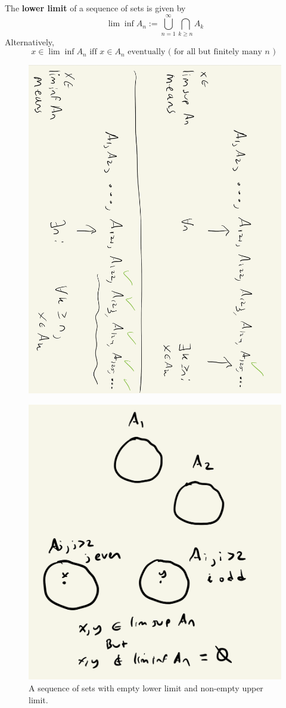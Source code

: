 \documentclass{article} %
\begin{document}
\begin{definition}
The \textbf{lower limit} of a sequence of sets is given by
\[ \lim\inf A_n := \bigcup_{n=1}^\infty \bigcap_{k \geq n} A_k \]
Alternatively,
\[ x \in \lim\inf A_n \text{ iff } x \in A_n \text{ eventually ( for all but finitely many $n$ ) } \]
\end{definition}

\begin{figure}[H]
\centering 
\includegraphics[angle=90, width=.6\textwidth]{images/limsup_and_liminf_of_sets}
\end{figure}

\begin{example}{}

\begin{figure}[H]
\centering 
\includegraphics[width=.5\textwidth]{images/limsup_and_liminf_of_sets_example}
\caption{A sequence of sets with empty lower limit and non-empty upper limit.}
\end{figure}

\end{example}
\end{document}
